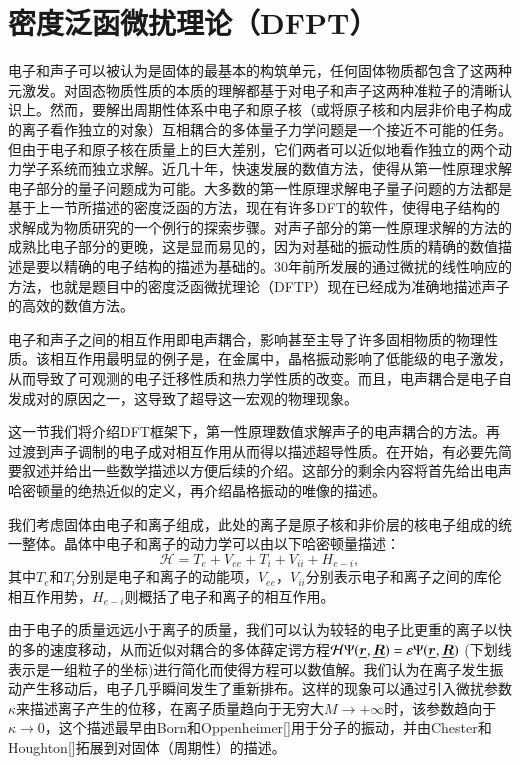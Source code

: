 \documentclass[phd,nobackinfo]{scutthesis}
\begin{document}
\section{密度泛函微扰理论（DFPT）}

电子和声子可以被认为是固体的最基本的构筑单元，任何固体物质都包含了这两种元激发。对固态物质性质的本质的理解都基于对电子和声子这两种准粒子的清晰认识上。然而，要解出周期性体系中电子和原子核（或将原子核和内层非价电子构成的离子看作独立的对象）互相耦合的多体量子力学问题是一个接近不可能的任务。但由于电子和原子核在质量上的巨大差别，它们两者可以近似地看作独立的两个动力学子系统而独立求解。近几十年，快速发展的数值方法，使得从第一性原理求解电子部分的量子问题成为可能。大多数的第一性原理求解电子量子问题的方法都是基于上一节所描述的密度泛函的方法，现在有许多DFT的软件，使得电子结构的求解成为物质研究的一个例行的探索步骤。对声子部分的第一性原理求解的方法的成熟比电子部分的更晚，这是显而易见的，因为对基础的振动性质的精确的数值描述是要以精确的电子结构的描述为基础的。30年前所发展的通过微扰的线性响应的方法，也就是题目中的密度泛函微扰理论（DFTP）现在已经成为准确地描述声子的高效的数值方法。

电子和声子之间的相互作用即电声耦合，影响甚至主导了许多固相物质的物理性质。该相互作用最明显的例子是，在金属中，晶格振动影响了低能级的电子激发，从而导致了可观测的电子迁移性质和热力学性质的改变。而且，电声耦合是电子自发成对的原因之一，这导致了超导这一宏观的物理现象。

这一节我们将介绍DFT框架下，第一性原理数值求解声子的电声耦合的方法。再过渡到声子调制的电子成对相互作用从而得以描述超导性质。在开始，有必要先简要叙述并给出一些数学描述以方便后续的介绍。这部分的剩余内容将首先给出电声哈密顿量的绝热近似的定义，再介绍晶格振动的唯像的描述。

我们考虑固体由电子和离子组成，此处的离子是原子核和非价层的核电子组成的统一整体。晶体中电子和离子的动力学可以由以下哈密顿量描述：
\begin{equation}
  \mathcal{H} = T_e + V_{ee} + T_i + V_{ii} + H_{e-i},
\end{equation}
其中$T_e$和$T_i$分别是电子和离子的动能项，$ V_{ee}$，$V_{ii}$分别表示电子和离子之间的库伦相互作用势，$H_{e-i}$则概括了电子和离子的相互作用。

由于电子的质量远远小于离子的质量，我们可以认为较轻的电子比更重的离子以快的多的速度移动，从而近似对耦合的多体薛定谔方程$\mathcal{H} \Psi(\underline{\bm{r}},\underline{\bm{R}})=\varepsilon \Psi(\underline{\bm{r}},\underline{\bm{R}})$ (下划线表示是一组粒子的坐标)进行简化而使得方程可以数值解。我们认为在离子发生振动产生移动后，电子几乎瞬间发生了重新排布。这样的现象可以通过引入微扰参数$\kappa$来描述离子产生的位移，在离子质量趋向于无穷大$M\rightarrow+\infty$时，该参数趋向于$\kappa\rightarrow 0$，这个描述最早由Born和Oppenheimer[]用于分子的振动，并由Chester和Houghton[]拓展到对固体（周期性）的描述。
\end{document}
